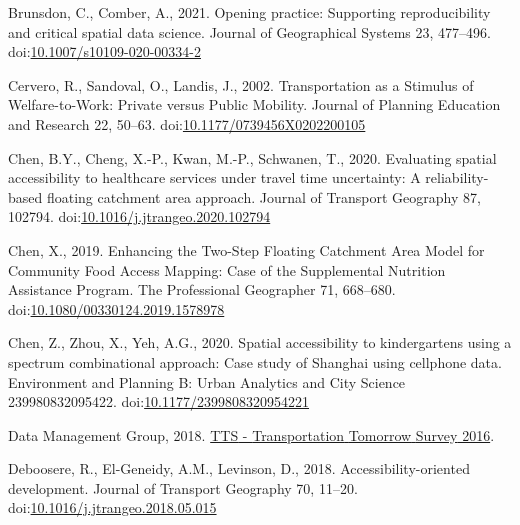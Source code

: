 \documentclass[]{elsarticle} %
\newlength{\cslhangindent}
\newlength{\cslentryspacingunit} %
\newenvironment{CSLReferences}[2] %
 {%
  \setlength{\parindent}{0pt}
  \ifodd #1
  \let\oldpar\par
  \def\par{\hangindent=\cslhangindent\oldpar}
  \fi
  \setlength{\parskip}{#2\cslentryspacingunit}
 }%
 {}
\begin{document}
\begin{CSLReferences}{1}{0}
\leavevmode{}%
Brunsdon, C., Comber, A., 2021. Opening practice: Supporting
reproducibility and critical spatial data science. Journal of
Geographical Systems 23, 477--496.
doi:\href{https://doi.org/10.1007/s10109-020-00334-2}{10.1007/s10109-020-00334-2}

\leavevmode{}%
Cervero, R., Sandoval, O., Landis, J., 2002. Transportation as a
{Stimulus} of {Welfare}-to-{Work}: {Private} versus {Public} {Mobility}.
Journal of Planning Education and Research 22, 50--63.
doi:\href{https://doi.org/10.1177/0739456X0202200105}{10.1177/0739456X0202200105}

\leavevmode{}%
Chen, B.Y., Cheng, X.-P., Kwan, M.-P., Schwanen, T., 2020. Evaluating
spatial accessibility to healthcare services under travel time
uncertainty: {A} reliability-based floating catchment area approach.
Journal of Transport Geography 87, 102794.
doi:\href{https://doi.org/10.1016/j.jtrangeo.2020.102794}{10.1016/j.jtrangeo.2020.102794}

\leavevmode{}%
Chen, X., 2019. Enhancing the {Two}-{Step} {Floating} {Catchment} {Area}
{Model} for {Community} {Food} {Access} {Mapping}: {Case} of the
{Supplemental} {Nutrition} {Assistance} {Program}. The Professional
Geographer 71, 668--680.
doi:\href{https://doi.org/10.1080/00330124.2019.1578978}{10.1080/00330124.2019.1578978}

\leavevmode{}%
Chen, Z., Zhou, X., Yeh, A.G., 2020. Spatial accessibility to
kindergartens using a spectrum combinational approach: {Case} study of
{Shanghai} using cellphone data. Environment and Planning B: Urban
Analytics and City Science 239980832095422.
doi:\href{https://doi.org/10.1177/2399808320954221}{10.1177/2399808320954221}

\leavevmode{}%
Data Management Group, 2018.
\href{http://dmg.utoronto.ca/transportation-tomorrow-survey/tts-introduction}{{TTS}
- {Transportation} {Tomorrow} {Survey} 2016}.

\leavevmode{}%
Deboosere, R., El-Geneidy, A.M., Levinson, D., 2018.
Accessibility-oriented development. Journal of Transport Geography 70,
11--20.
doi:\href{https://doi.org/10.1016/j.jtrangeo.2018.05.015}{10.1016/j.jtrangeo.2018.05.015}


\end{CSLReferences}
\end{document}
